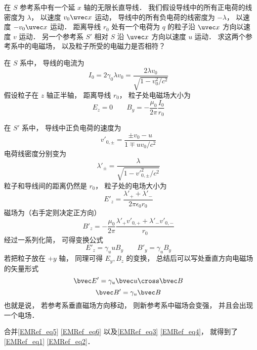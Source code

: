 在 $S$ 参考系中有一个延 $x$ 轴的无限长直导线． 我们假设导线中的所有正电荷的线密度为 $\lambda$， 以速度 $v_0\uvec x$ 运动， 导线中的所有负电荷的线密度为 $-\lambda$，  以速度 $-v_0\uvec x$ 运动． 距离导线 $r_0$ 处有一个电荷为 $q$ 的粒子沿 $\uvec x$ 方向以速度 $v$ 运动． 另一个参考系 $S'$ 相对 $S$ 沿 $\uvec x$ 方向以速度 $u$ 运动． 求这两个参考系中的电磁场， 以及粒子所受的电磁力是否相符？

在 $S$ 系中， 导线的电流为
\begin{equation}
I_0 = 2 \gamma_0 \lambda v_0 = \frac{2 \lambda v_0}{\sqrt{1 - v_0^2/c^2}}
\end{equation}
假设粒子在 $z$ 轴正半轴， 距离导线 $r_0$， 粒子处电磁场大小为
\begin{equation}
E_z = 0 \qquad B_y = -\frac{\mu_0}{2\pi} \frac{I_0}{r_0}
\end{equation}

在 $S'$ 系中， 导线中正负电荷的速度为
\begin{equation}
v'_{0, \pm} = \frac{\pm v_0-u}{1 \mp uv_0/c^2}
\end{equation}
电荷线密度分别变为
\begin{equation}
\lambda'_\pm = \frac{\lambda}{\sqrt{1 - v'^2_{0,\pm}/c^2}}
\end{equation}
粒子和导线间的距离仍然是 $r_0$， 粒子处的电场大小为
\begin{equation}
E'_z = \frac{\lambda'_+ + \lambda'_-}{2 \pi \epsilon_{0} r_0}
\end{equation}
磁场为（右手定则决定正方向）
\begin{equation}
B'_z = -\frac{\mu_0}{2\pi} \frac{\lambda'_+ v'_{0,+} + \lambda'_- v'_{0,-}}{r_0}
\end{equation}
经过一系列化简， 可得变换公式
\begin{equation}
E'_z = \gamma_u u B_y
\qquad
B'_y = \gamma_u B_y
\end{equation}
若把粒子放在 $+y$ 轴， 同理可得 $E_y, B_z$ 的变换， 总结后可以写处垂直方向电磁场的矢量形式
\begin{equation}\label{EMRef_eq3}
\bvec E' = \gamma_u \bvec u \cross \bvec B
\end{equation}
\begin{equation}\label{EMRef_eq4}
\bvec B' = \gamma_u \bvec B
\end{equation}
也就是说， 若参考系垂直磁场方向移动， 则新参考系中磁场会变强， 并且会出现一个电场．

合并\autoref{EMRef_eq5} \autoref{EMRef_eq6} 以及\autoref{EMRef_eq3} \autoref{EMRef_eq4}， 就得到了\autoref{EMRef_eq1} \autoref{EMRef_eq2}．

